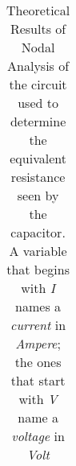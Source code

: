 \begin{table}
  \parbox{.45\linewidth}{
    \centering
    \begin{tabular}{|c|c|c|}
      \hline
      
    \end{tabular}
    \label{tab:TheoreticalResults}
    \caption{Theoretical Results of Nodal Analysis of the circuit used to determine the equivalent resistance seen by the capacitor. A variable that begins  with \textit{I} names a \textit{current} in \textit{Ampere}; the ones that start with \textit{V} name a \textit{voltage} in \textit{Volt} }
  }
  \hfill
\end{table}






